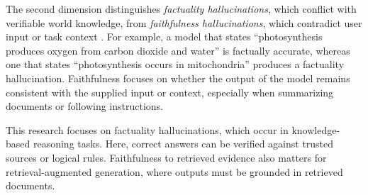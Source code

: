 The second dimension distinguishes \textit{factuality hallucinations}, which conflict with verifiable world knowledge, from \textit{faithfulness hallucinations}, which contradict user input or task context \cite{huang2025survey}. For example, a model that states ``photosynthesis produces oxygen from carbon dioxide and water'' is factually accurate, whereas one that states ``photosynthesis occurs in mitochondria'' produces a factuality hallucination. Faithfulness focuses on whether the output of the model remains consistent with the supplied input or context, especially when summarizing documents or following instructions.

This research focuses on factuality hallucinations, which occur in knowledge-based reasoning tasks. Here, correct answers can be verified against trusted sources or logical rules. Faithfulness to retrieved evidence also matters for retrieval-augmented generation, where outputs must be grounded in retrieved documents.

